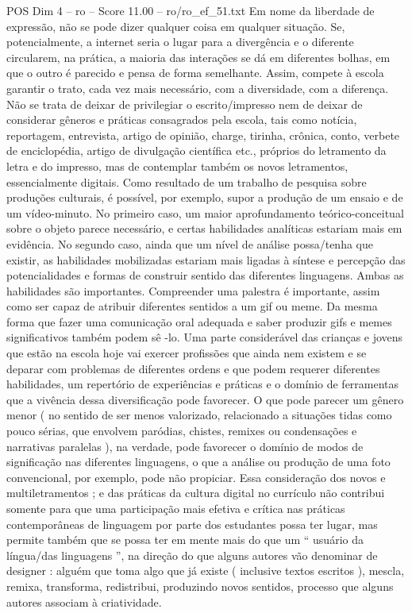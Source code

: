 \begin{textsample}{POS Dim 4 – ro – Score 11.00 – ro/ro\_ef\_51.txt}
Em nome da liberdade de expressão, não se pode dizer qualquer coisa em qualquer situação.
Se, potencialmente, a internet seria o lugar para a divergência e o diferente circularem, na prática, a maioria das interações se dá em diferentes bolhas, em que o outro é parecido e pensa de forma semelhante.
Assim, compete à escola garantir o trato, cada vez mais necessário, com a diversidade, com a diferença.
Não se trata de deixar de privilegiar o escrito/impresso nem de deixar de considerar gêneros e práticas consagrados pela escola, tais como notícia, reportagem, entrevista, artigo de opinião, charge, tirinha, crônica, conto, verbete de enciclopédia, artigo de divulgação científica etc., próprios do letramento da letra e do impresso, mas de contemplar também os novos letramentos, essencialmente digitais.
Como resultado de um trabalho de pesquisa sobre produções culturais, é possível, por exemplo, supor a produção de um ensaio e de um vídeo-minuto.
No primeiro caso, um maior aprofundamento teórico-conceitual sobre o objeto parece necessário, e certas habilidades analíticas estariam mais em evidência.
No segundo caso, ainda que um nível de análise possa/tenha que existir, as habilidades mobilizadas estariam mais ligadas à síntese e percepção das potencialidades e formas de construir sentido das diferentes linguagens.
Ambas as habilidades são importantes.
Compreender uma palestra é importante, assim como ser capaz de atribuir diferentes sentidos a um gif ou meme.
Da mesma forma que fazer uma comunicação oral adequada e saber produzir gifs e memes significativos também podem sê -lo.
Uma parte considerável das crianças e jovens que estão na escola hoje vai exercer profissões que ainda nem existem e se deparar com problemas de diferentes ordens e que podem requerer diferentes habilidades, um repertório de experiências e práticas e o domínio de ferramentas que a vivência dessa diversificação pode favorecer.
O que pode parecer um gênero menor ( no sentido de ser menos valorizado, relacionado a situações tidas como pouco sérias, que envolvem paródias, chistes, remixes ou condensações e narrativas paralelas ), na verdade, pode favorecer o domínio de modos de significação nas diferentes linguagens, o que a análise ou produção de uma foto convencional, por exemplo, pode não propiciar.
Essa consideração dos novos e multiletramentos ; e das práticas da cultura digital no currículo não contribui somente para que uma participação mais efetiva e crítica nas práticas contemporâneas de linguagem por parte dos estudantes possa ter lugar, mas permite também que se possa ter em mente mais do que um “ usuário da língua/das linguagens ”, na direção do que alguns autores vão denominar de designer : alguém que toma algo que já existe ( inclusive textos escritos ), mescla, remixa, transforma, redistribui, produzindo novos sentidos, processo que alguns autores associam à criatividade.

\end{textsample}
